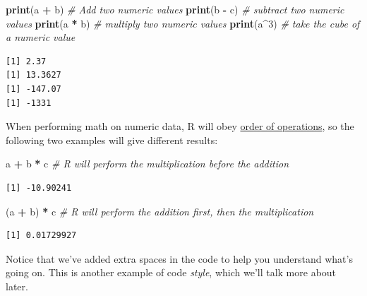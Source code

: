\documentclass[
]{book}
\newenvironment{Shaded}{\begin{snugshade}}{\end{snugshade}}
\newcommand{\CommentTok}[1]{\textcolor[rgb]{0.56,0.35,0.01}{\textit{#1}}}
\newcommand{\DecValTok}[1]{\textcolor[rgb]{0.00,0.00,0.81}{#1}}
\newcommand{\KeywordTok}[1]{\textcolor[rgb]{0.13,0.29,0.53}{\textbf{#1}}}
\newcommand{\NormalTok}[1]{#1}
\newcommand{\OperatorTok}[1]{\textcolor[rgb]{0.81,0.36,0.00}{\textbf{#1}}}
\newcommand{\StringTok}[1]{\textcolor[rgb]{0.31,0.60,0.02}{#1}}
\begin{document}
\begin{Shaded}
\begin{Highlighting}[]
\KeywordTok{print}\NormalTok{(a }\OperatorTok{+}\StringTok{ }\NormalTok{b)  }\CommentTok{# Add two numeric values}
\KeywordTok{print}\NormalTok{(b }\OperatorTok{-}\StringTok{ }\NormalTok{c)  }\CommentTok{# subtract two numeric values }
\KeywordTok{print}\NormalTok{(a }\OperatorTok{*}\StringTok{ }\NormalTok{b)  }\CommentTok{# multiply two numeric values}
\KeywordTok{print}\NormalTok{(a}\OperatorTok{^}\DecValTok{3}\NormalTok{)    }\CommentTok{# take the cube of a numeric value}
\end{Highlighting}
\end{Shaded}

\begin{verbatim}
[1] 2.37
[1] 13.3627
[1] -147.07
[1] -1331
\end{verbatim}

When performing math on numeric data, R will obey \href{https://en.wikipedia.org/wiki/Order_of_operations}{order of operations}, so the following two examples will give different results:

\begin{Shaded}
\begin{Highlighting}[]
\NormalTok{a }\OperatorTok{+}\StringTok{ }\NormalTok{b }\OperatorTok{*}\StringTok{ }\NormalTok{c    }\CommentTok{# R will perform the multiplication before the addition}
\end{Highlighting}
\end{Shaded}

\begin{verbatim}
[1] -10.90241
\end{verbatim}

\begin{Shaded}
\begin{Highlighting}[]
\NormalTok{(a }\OperatorTok{+}\StringTok{ }\NormalTok{b) }\OperatorTok{*}\StringTok{ }\NormalTok{c  }\CommentTok{# R will perform the addition first, then the multiplication }
\end{Highlighting}
\end{Shaded}

\begin{verbatim}
[1] 0.01729927
\end{verbatim}

Notice that we've added extra spaces in the code to help you understand what's going on.
This is another example of code \emph{style}, which we'll talk more about later.
\end{document}
